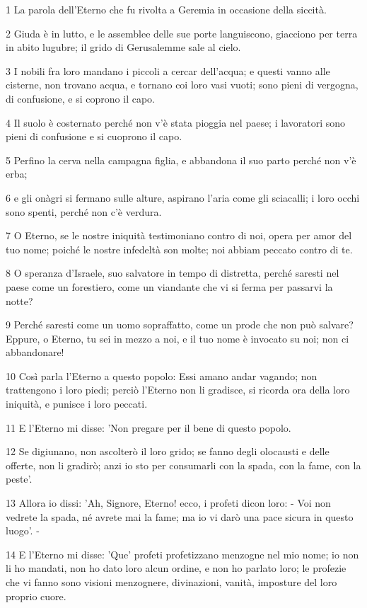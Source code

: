 \par 1 La parola dell'Eterno che fu rivolta a Geremia in occasione della siccità.
\par 2 Giuda è in lutto, e le assemblee delle sue porte languiscono, giacciono per terra in abito lugubre; il grido di Gerusalemme sale al cielo.
\par 3 I nobili fra loro mandano i piccoli a cercar dell'acqua; e questi vanno alle cisterne, non trovano acqua, e tornano coi loro vasi vuoti; sono pieni di vergogna, di confusione, e si coprono il capo.
\par 4 Il suolo è costernato perché non v'è stata pioggia nel paese; i lavoratori sono pieni di confusione e si cuoprono il capo.
\par 5 Perfino la cerva nella campagna figlia, e abbandona il suo parto perché non v'è erba;
\par 6 e gli onàgri si fermano sulle alture, aspirano l'aria come gli sciacalli; i loro occhi sono spenti, perché non c'è verdura.
\par 7 O Eterno, se le nostre iniquità testimoniano contro di noi, opera per amor del tuo nome; poiché le nostre infedeltà son molte; noi abbiam peccato contro di te.
\par 8 O speranza d'Israele, suo salvatore in tempo di distretta, perché saresti nel paese come un forestiero, come un viandante che vi si ferma per passarvi la notte?
\par 9 Perché saresti come un uomo sopraffatto, come un prode che non può salvare? Eppure, o Eterno, tu sei in mezzo a noi, e il tuo nome è invocato su noi; non ci abbandonare!
\par 10 Così parla l'Eterno a questo popolo: Essi amano andar vagando; non trattengono i loro piedi; perciò l'Eterno non li gradisce, si ricorda ora della loro iniquità, e punisce i loro peccati.
\par 11 E l'Eterno mi disse: 'Non pregare per il bene di questo popolo.
\par 12 Se digiunano, non ascolterò il loro grido; se fanno degli olocausti e delle offerte, non li gradirò; anzi io sto per consumarli con la spada, con la fame, con la peste'.
\par 13 Allora io dissi: 'Ah, Signore, Eterno! ecco, i profeti dicon loro: - Voi non vedrete la spada, né avrete mai la fame; ma io vi darò una pace sicura in questo luogo'. -
\par 14 E l'Eterno mi disse: 'Que' profeti profetizzano menzogne nel mio nome; io non li ho mandati, non ho dato loro alcun ordine, e non ho parlato loro; le profezie che vi fanno sono visioni menzognere, divinazioni, vanità, imposture del loro proprio cuore.
